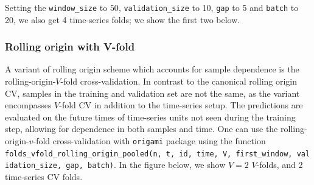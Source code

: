 \documentclass[12pt, krantz2,]{book}
\newenvironment{Shaded}{\begin{snugshade}}{\end{snugshade}}
\newcommand{\CommentTok}[1]{\textcolor[rgb]{0.56,0.35,0.01}{\textit{#1}}}
\newcommand{\DataTypeTok}[1]{\textcolor[rgb]{0.13,0.29,0.53}{#1}}
\newcommand{\DecValTok}[1]{\textcolor[rgb]{0.00,0.00,0.81}{#1}}
\newcommand{\KeywordTok}[1]{\textcolor[rgb]{0.13,0.29,0.53}{\textbf{#1}}}
\newcommand{\NormalTok}[1]{#1}
\newcommand{\StringTok}[1]{\textcolor[rgb]{0.31,0.60,0.02}{#1}}
\theoremstyle{definition}
\theoremstyle{definition}
\theoremstyle{definition}
\newcommand{\1}{\mathbbm{1}}
\begin{document}
Setting the \texttt{window\_size} to \(50\), \texttt{validation\_size} to 10, \texttt{gap} to 5 and
\texttt{batch} to 20, we also get 4 time-series folds; we show the first two below.

\begin{Shaded}
\end{Shaded}

\hypertarget{rolling-origin-with-v-fold}{%
\subsubsection{Rolling origin with V-fold}\label{rolling-origin-with-v-fold}}

A variant of rolling origin scheme which accounts for sample dependence is the
rolling-origin-\(V\)-fold cross-validation. In contrast to the canonical rolling
origin CV, samples in the training and validation set are not the same, as the
variant encompasses \(V\)-fold CV in addition to the time-series setup. The
predictions are evaluated on the future times of time-series units not seen
during the training step, allowing for dependence in both samples and time. One
can use the rolling-origin-\(v\)-fold cross-validation with \texttt{origami} package
using the function \texttt{folds\_vfold\_rolling\_origin\_pooled(n,\ t,\ id,\ time,\ V,\ first\_window,\ validation\_size,\ gap,\ batch)}. In the figure below, we show \(V=2\)
\(V\)-folds, and 2 time-series CV folds.
\end{document}
